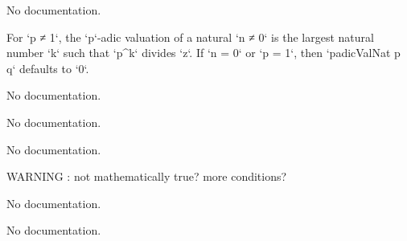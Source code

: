 \begin{theorem}\label{finite_nat_iff'}
                No documentation.
    \end{theorem}

\begin{definition}\label{padicValNat'}
        \leanok
                For `p ≠ 1`, the `p`-adic valuation of a natural `n ≠ 0` is the largest natural number `k` such
that `p^k` divides `z`. If `n = 0` or `p = 1`, then `padicValNat p q` defaults to `0`.
    \end{definition}

\begin{theorem}\label{finite_ideal_iff}
                No documentation.
    \end{theorem}

\begin{theorem}\label{ord_top}
                No documentation.
    \end{theorem}

\begin{theorem}\label{Valuation.integral_closure_eq_integer_of_helselian}
                No documentation.
    \end{theorem}

\begin{theorem}\label{Valuation.integral_closure_eq_integer_of_complete_of_ext}
                WARNING : not mathematically true? more conditions?
    \end{theorem}

\begin{theorem}\label{Valuation.unique_valuationSubring_of_ext}
                No documentation.
    \end{theorem}

\begin{theorem}\label{Valuation.unique_val_of_ext}
        \leanok
                No documentation.
    \end{theorem}

